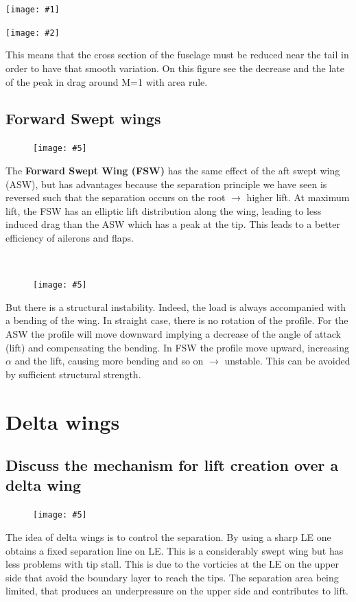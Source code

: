 \documentclass[british,french,11pt, a4paper, openany]{article}
\newcommand{\wrapfig}[6]{%
	\begin{figure}%
		\vspace{-5mm}%
		\texttt{[image: \#5]}%
		\captionof{figure}{}%
		\label{#6}%
	\end{figure}%
}
\newcommand{\minifig}[6]{
	\begin{center}%
		\begin{minipage}{#5\textwidth}%
			\texttt{[image: \#1]}%
			\captionof{figure}{}%
			\label{#1}%
		\end{minipage}%
		\begin{minipage}{#6\textwidth}%
			\texttt{[image: \#2]}%
			\captionof{figure}{}%
			\label{#2}%
		\end{minipage}%
	\end{center}
}
\begin{document}
\minifig{ch7/18}{ch7/19}{0.12}{0.12}{0.35}{0.3}


This means that the cross section of the fuselage must be reduced near the tail in order to have that smooth variation. On this figure see the decrease and the late of the peak in drag around M=1 with area rule.

\subsection{Forward Swept wings}
\wrapfig{6}{l}{3}{0.1}{ch7/14}{ch7/14}
The \textbf{Forward Swept Wing (FSW)} has the same effect of the aft swept wing (ASW), but has advantages because the separation principle we have seen is reversed such that the separation occurs on the root $\rightarrow$ higher lift. At maximum lift, the FSW has an elliptic lift distribution along the wing, leading to less induced drag than the ASW which has a peak at the tip. This leads to a better efficiency of ailerons and flaps. 

\ \\

\wrapfig{6}{r}{5}{0.1}{ch7/15}{ch7/15} 
But there is a structural instability. Indeed, the load is always accompanied with a bending of the wing. In straight case, there is no rotation of the profile. For the ASW the profile will move downward implying a decrease of the angle of attack (lift) and compensating the bending. In FSW the profile move upward, increasing $\alpha$ and the lift, causing more bending and so on $\rightarrow$ unstable. This can be avoided by sufficient structural strength.



\section{Delta wings}
\subsection{Discuss the mechanism for lift creation over a delta wing}
\wrapfig{9}{l}{5}{0.15}{ch7/21}{ch7/21}
The idea of delta wings is to control the separation. By using a sharp LE one obtains a fixed separation line on LE. This is a considerably swept wing but has less problems with tip stall. This is due to the vorticies at the LE on the upper side that avoid the boundary layer to reach the tips. The separation area being limited, that produces an underpressure on the upper side and contributes to lift. 
\end{document}
